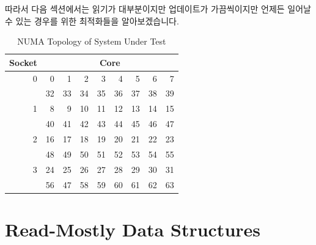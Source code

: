 따라서 다음 섹션에서는 읽기가 대부분이지만 업데이트가 가끔씩이지만 언제든
일어날 수 있는 경우를 위한 최적화들을 알아보겠습니다.

\begin{table}
\footnotesize
\centering
\begin{tabular}{r|r|r|r|r|r|r|r|r}
	Socket & \multicolumn{8}{|c}{Core} \\
	\hline
	0 &  0 &  1 &  2 &  3 &  4 &  5 &  6 &  7 \\
	  & 32 & 33 & 34 & 35 & 36 & 37 & 38 & 39 \\
	\hline
	1 &  8 &  9 & 10 & 11 & 12 & 13 & 14 & 15 \\
	  & 40 & 41 & 42 & 43 & 44 & 45 & 46 & 47 \\
	\hline
	2 & 16 & 17 & 18 & 19 & 20 & 21 & 22 & 23 \\
	  & 48 & 49 & 50 & 51 & 52 & 53 & 54 & 55 \\
	\hline
	3 & 24 & 25 & 26 & 27 & 28 & 29 & 30 & 31 \\
	  & 56 & 47 & 58 & 59 & 60 & 61 & 62 & 63 \\
\end{tabular}
\caption{NUMA Topology of System Under Test}
\label{tab:datastruct:NUMA Topology of System Under Test}
\end{table}

\section{Read-Mostly Data Structures}
\label{sec:datastruct:Read-Mostly Data Structures}

